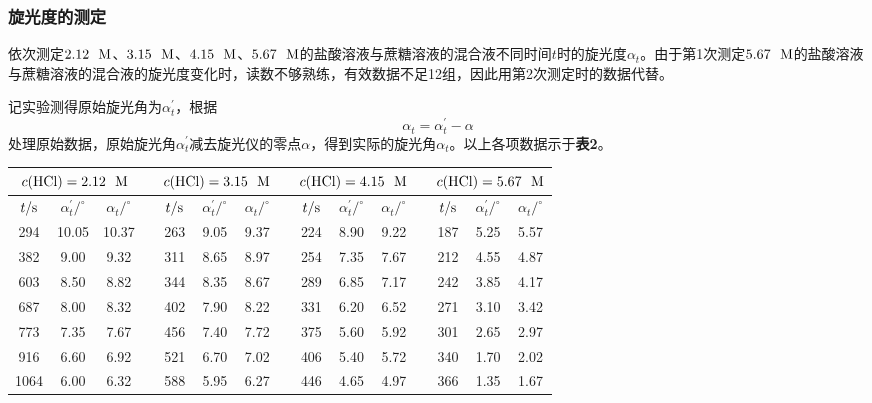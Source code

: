 \documentclass[12pt]{article}
\begin{document}
 \subsubsection{旋光度的测定}
依次测定$2.12\ \ {\rm M}$、$3.15\ \ {\rm M}$、$4.15\ \ {\rm M}$、$5.67\ \ {\rm M}$的盐酸溶液与蔗糖溶液的混合液不同时间$t$时的旋光度$\alpha_{t}$。由于第1次测定$5.67\ \ {\rm M}$的盐酸溶液与蔗糖溶液的混合液的旋光度变化时，读数不够熟练，有效数据不足12组，因此用第2次测定时的数据代替。\par 
记实验测得原始旋光角为$\alpha^{\prime}_{t}$，根据
$$
\alpha_{t}=\alpha^{\prime}_{t}-\alpha
$$
处理原始数据，原始旋光角$\alpha^{\prime}_{t}$减去旋光仪的零点$\alpha$，得到实际的旋光角$\alpha_{t}$。以上各项数据示于\textbf{表2}。
 \begin{table}[h]
 	\centering
 	\begin{tabular}{ccccccccccccccc}
 		\toprule
 		\multicolumn{3}{c}{$c({\rm HCl})=2.12\ \ {\rm M}$} & & \multicolumn{3}{c}{$c({\rm HCl})=3.15\ \ {\rm M}$} & & \multicolumn{3}{c}{$c({\rm HCl})=4.15\ \ {\rm M}$} & & \multicolumn{3}{c}{$c({\rm HCl})=5.67\ \ {\rm M}$} \\
 		\midrule
 		$t/{\rm s}$ & $\alpha^{\prime}_{t}/^{\circ}$ & $\alpha_{t}/^{\circ}$ & & $t/{\rm s}$ & $\alpha^{\prime}_{t}/^{\circ}$ & $\alpha_{t}/^{\circ}$ & &$t/{\rm s}$ & $\alpha^{\prime}_{t}/^{\circ}$ & $\alpha_{t}/^{\circ}$ & &$t/{\rm s}$ & $\alpha^{\prime}_{t}/^{\circ}$ & $\alpha_{t}/^{\circ}$   \\
 		\midrule
294  & 10.05 & 10.37 & & 263  & 9.05  & 9.37&  & 224  & 8.90  & 9.22 & & 187 & 5.25  & 5.57  \\
382  & 9.00  & 9.32  & &311  & 8.65  & 8.97 & & 254  & 7.35  & 7.67  & & 212 & 4.55  & 4.87  \\
603  & 8.50  & 8.82  & & 344  & 8.35  & 8.67&  & 289  & 6.85  & 7.17 & & 242 & 3.85  & 4.17  \\
687  & 8.00  & 8.32&  & 402  & 7.90  & 8.22&  & 331  & 6.20  & 6.52  & &271 & 3.10  & 3.42  \\
773  & 7.35  & 7.67 & & 456  & 7.40  & 7.72 & & 375  & 5.60  & 5.92 & & 301 & 2.65  & 2.97  \\
916  & 6.60  & 6.92&  & 521  & 6.70  & 7.02 & & 406  & 5.40  & 5.72 & & 340 & 1.70  & 2.02  \\
1064 & 6.00  & 6.32 & & 588  & 5.95  & 6.27 & & 446  & 4.65  & 4.97 & & 366 & 1.35  & 1.67  \\

\end{tabular}
\end{table}
\end{document}

